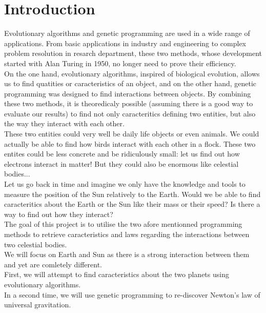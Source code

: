 \section{Introduction}
Evolutionary algorithms and genetic programming are used in a wide range of applications. From basic applications in industry and engineering to complex problem resolution in resarch department, these two methods, whose development started with Alan Turing in 1950, no longer need to prove their efficiency.\\


On the one hand, evolutionary algorithms, inspired of biological evolution, allows us to find quatities or caracteristics of an object, and on the other hand, genetic programming was designed to find interactions between objects. By combining these two methods, it is theoredicaly possible (assuming there is a good way to evaluate our results) to find not only caracteritics defining two entities, but also the way they interact with each other.\\
These two entities could very well be daily life objects or even animals. We could actually be able to find how birds interact with each other in a flock. These two entites could be less concrete and be ridiculously small: let us find out how electrons interact in matter! But they could also be enormous like celestial bodies...\\

Let us go back in time and imagine we only have the knowledge and tools to measure the position of the Sun relatively to the Earth. Would we be able to find caracteritics about the Earth or the Sun like their mass or their speed? Is there a way to find out how they interact?\\

The goal of this project is to utilise the two afore mentionned programming methods to retrieve caracteristics and laws regarding the interactions between two celestial bodies.\\
We will focus on Earth and Sun as there is a strong interaction between them and yet are comletely different.\\
First, we will attempt to find caracteristics about the two planets using evolutionary algorithms.\\
In a second time, we will use genetic programming to re-discover Newton's law of universal gravitation.

